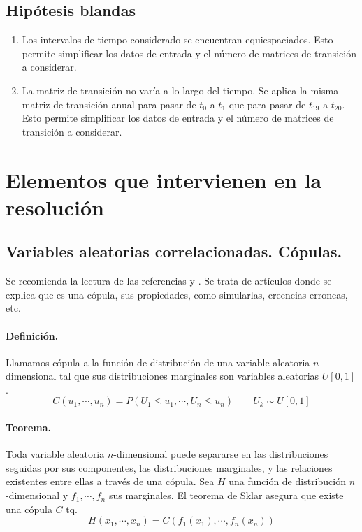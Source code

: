 \subsection{Hip\'otesis blandas}
\begin{enumerate}
\item Los intervalos de tiempo considerado se encuentran equiespaciados. Esto 
permite simplificar los datos de entrada y el n\'umero de matrices de 
transici\'on a considerar.
\item La matriz de transici\'on no var\'ia a lo largo del tiempo. Se aplica 
la misma matriz de transici\'on anual para pasar de $t_0$ a $t_1$ que para 
pasar de $t_{19}$ a $t_{20}$. Esto permite simplificar los datos de entrada y 
el n\'umero de matrices de transici\'on a considerar.
\end{enumerate}


\section{Elementos que intervienen en la resoluci\'on}

\subsection{Variables aleatorias correlacionadas. C\'opulas.}

Se recomienda la lectura de las referencias \cite{copu:wang} y 
\cite{copu:pitfalls}. Se trata de art\'iculos donde se explica que es una 
c\'opula, sus propiedades, como simularlas, creencias erroneas, etc.

\paragraph{Definici\'on.} Llamamos c\'opula a la funci\'on de distribuci\'on
de una variable aleatoria $n$-dimensional tal que sus distribuciones marginales 
son variables aleatorias $U[0,1]$.
\begin{displaymath}
C(u_1, \cdots,u_n)=P(U_1 \leq u_1, \cdots, U_n \leq u_n) \qquad U_k \sim U[0,1]
\end{displaymath}

\paragraph{Teorema.} Toda variable aleatoria $n$-dimensional puede separarse 
en las distribuciones seguidas por sus componentes, las distribuciones marginales,
y las relaciones existentes entre ellas a trav\'es de una c\'opula. Sea $H$ 
una funci\'on de distribuci\'on $n$-dimensional y $f_1,\cdots, f_n$ sus marginales. 
El teorema de Sklar asegura que existe una c\'opula $C$ tq.
\begin{displaymath}
H(x_1, \cdots,x_n) = C(f_1(x_1), \cdots, f_n(x_n)) 
\end{displaymath}


